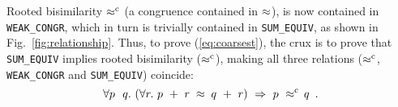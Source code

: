 %
Rooted bisimilarity $\mathrel{\approx^{\rm{c}}}$ (a congruence contained in
$\approx$), is now contained in \texttt{WEAK_CONGR},
which in turn is trivially contained in \texttt{SUM_EQUIV}, as shown
in Fig.~\ref{fig:relationship}. Thus, to prove (\ref{eq:coarsest}),
the crux is to prove that \texttt{SUM_EQUIV} implies
rooted bisimilarity ($\mathrel{\approx^{\rm{c}}}$), making all three relations
($\mathrel{\approx^{\rm{c}}}$, \texttt{WEAK_CONGR} and \texttt{SUM_EQUIV}) coincide:
\begin{equation}
\label{equa:pq}
\forall p\ \ q.\ ( \forall r.\ p\ +\ r \;\approx\; q\ +\ r ) \
\Rightarrow\ p\ \mathrel{\approx^{\rm{c}}}\ \! q\enspace.
\end{equation}

